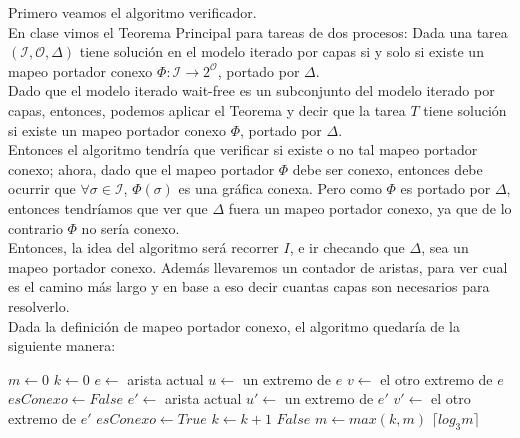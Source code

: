 \documentclass{article}
\begin{document}
\begin{enumerate}
{    Primero veamos el algoritmo verificador.\\
    En clase vimos el Teorema Principal para tareas de dos procesos: Dada una tarea $(\mathcal{I},\mathcal{O},\Delta)$
    tiene solución en el modelo iterado por capas si y solo si existe un mapeo portador conexo
    $\Phi: \mathcal{I} \rightarrow 2^{\mathcal{O}}$, portado por $\Delta$.\\
    Dado que el modelo iterado wait-free es un subconjunto del modelo iterado por capas, entonces, podemos
    aplicar el Teorema y decir que la tarea $T$ tiene solución si existe un mapeo portador conexo $\Phi$, portado por $\Delta$.\\
    Entonces el algoritmo tendría que verificar si existe o no tal mapeo portador conexo; ahora, dado que el mapeo portador
    $\Phi$ debe ser conexo, entonces debe ocurrir que $\forall\sigma\in\mathcal{I}$, $\Phi(\sigma)$ es una
    gráfica conexa. Pero como $\Phi$ es portado por $\Delta$, entonces tendríamos que ver que $\Delta$ fuera un mapeo portador
    conexo, ya que de lo contrario $\Phi$ no sería conexo.\\
    Entonces, la idea del algoritmo será recorrer $I$, e ir checando que $\Delta$, sea un mapeo portador conexo.
    Además llevaremos un contador de aristas, para ver cual es el camino más largo y en base a eso decir cuantas capas
    son necesarios para resolverlo.\\
    Dada la definición de mapeo portador conexo, el algoritmo quedaría de la siguiente manera:\\
    
    \begin{algorithmic}
    \STATE $m \leftarrow 0$ 
    \STATE $k \leftarrow 0$ 
    \STATE $e \leftarrow $ arista actual
    \STATE $u \leftarrow $ un extremo de $e$
    \STATE $v \leftarrow $ el otro extremo de $e$
    \STATE $esConexo \leftarrow False$
    \STATE $e' \leftarrow $ arista actual
    \STATE $u' \leftarrow $ un extremo de $e'$
    \STATE $v' \leftarrow $ el otro extremo de $e'$
    \STATE $esConexo \leftarrow True$
    \ENDIF
    \STATE $k \leftarrow k + 1$
    \ENDIF
    \ENDFOR
    \RETURN $False$
    \ENDIF
    \STATE $m \leftarrow max(k, m)$
    \ENDFOR
    \RETURN $\lceil log_{3} m \rceil$
    \end{algorithmic}

}
\end{enumerate}
\end{document}
